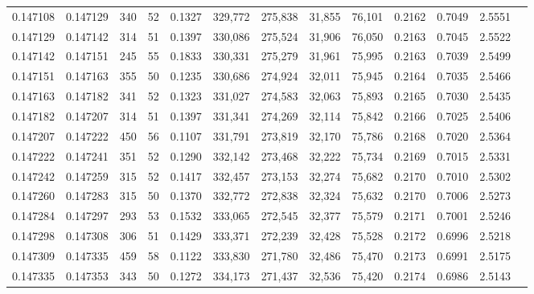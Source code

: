 \begin{tabular}{rrrrrrrrrrrrr}
0.147108 & 0.147129 &   340 &  52 &                                     0.1327 & 329,772 & 275,838 &  31,855 &  76,101 & 0.2162 & 0.7049 & 2.5551 \\
0.147129 & 0.147142 &   314 &  51 &                                     0.1397 & 330,086 & 275,524 &  31,906 &  76,050 & 0.2163 & 0.7045 & 2.5522 \\
0.147142 & 0.147151 &   245 &  55 &                                     0.1833 & 330,331 & 275,279 &  31,961 &  75,995 & 0.2163 & 0.7039 & 2.5499 \\
0.147151 & 0.147163 &   355 &  50 &                                     0.1235 & 330,686 & 274,924 &  32,011 &  75,945 & 0.2164 & 0.7035 & 2.5466 \\
0.147163 & 0.147182 &   341 &  52 &                                     0.1323 & 331,027 & 274,583 &  32,063 &  75,893 & 0.2165 & 0.7030 & 2.5435 \\
0.147182 & 0.147207 &   314 &  51 &                                     0.1397 & 331,341 & 274,269 &  32,114 &  75,842 & 0.2166 & 0.7025 & 2.5406 \\
0.147207 & 0.147222 &   450 &  56 &                                     0.1107 & 331,791 & 273,819 &  32,170 &  75,786 & 0.2168 & 0.7020 & 2.5364 \\
0.147222 & 0.147241 &   351 &  52 &                                     0.1290 & 332,142 & 273,468 &  32,222 &  75,734 & 0.2169 & 0.7015 & 2.5331 \\
0.147242 & 0.147259 &   315 &  52 &                                     0.1417 & 332,457 & 273,153 &  32,274 &  75,682 & 0.2170 & 0.7010 & 2.5302 \\
0.147260 & 0.147283 &   315 &  50 &                                     0.1370 & 332,772 & 272,838 &  32,324 &  75,632 & 0.2170 & 0.7006 & 2.5273 \\
0.147284 & 0.147297 &   293 &  53 &                                     0.1532 & 333,065 & 272,545 &  32,377 &  75,579 & 0.2171 & 0.7001 & 2.5246 \\
0.147298 & 0.147308 &   306 &  51 &                                     0.1429 & 333,371 & 272,239 &  32,428 &  75,528 & 0.2172 & 0.6996 & 2.5218 \\
0.147309 & 0.147335 &   459 &  58 &                                     0.1122 & 333,830 & 271,780 &  32,486 &  75,470 & 0.2173 & 0.6991 & 2.5175 \\
0.147335 & 0.147353 &   343 &  50 &                                     0.1272 & 334,173 & 271,437 &  32,536 &  75,420 & 0.2174 & 0.6986 & 2.5143 \\

\end{tabular}
